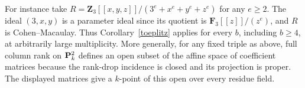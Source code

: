 For instance take $R=\mathbf Z_3[[x,y,z]]/(3^e+x^e+y^e+z^e)$ for any $e\ge2$. The ideal $(3,x,y)$ is a parameter ideal since its quotient is $\mathbf F_3[[z]]/(z^e)$, and $R$ is Cohen--Macaulay. Thus Corollary~\ref{toeplitz} applies for every $b$, including $b\ge4$, at arbitrarily large multiplicity. More generally, for any fixed triple as above, full column rank on $\mathbf P^2_k$ defines an open subset of the affine space of coefficient matrices because the rank-drop incidence is closed and its projection is proper. The displayed matrices give a $k$-point of this open over every residue field.
